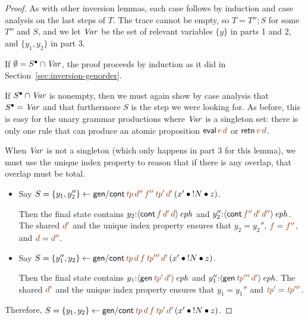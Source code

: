 \begin{proof}
  As with other inversion lemmas, each case follows by induction and
  case analysis on the last steps of $T$. The trace cannot be empty,
  so $T = T''; S$ for some $T''$ and $S$, and we let ${\it Var}$ be
  the set of relevant variables $\{y\}$ in parts 1 and 2, and
  $\{y_1,y_2\}$ in part 3.

  If $\emptyset = S^{\bullet} \cap {\it Var}$, the proof proceeds by
  induction as it did in Section~\ref{sec:inversion-genorder}.

  If $S^{\bullet} \cap {\it Var}$ is nonempty, then we must again show
  by case analysis that $S^{\bullet} = {\it Var}$ and that furthermore
  $S$ is the step we were looking for. As before, this is easy for the
  unary grammar productions where ${\it Var}$ is a singleton set:
  there is only one rule that can produce an atomic proposition 
  ${\sf eval}\,\lf{e}\,\lf{d}$ or ${\sf retn}\,\lf{v}\,\lf{d}$. 

  When ${\it Var}$ is not a singleton (which only happens in part 3
  for this lemma), we must use the unique index property to reason
  that if there is any overlap, that overlap must be total.
  \begin{itemize}
  \item Say $S = \trstep{y_1, y_2''}
    {{\sf gen/cont}\,
      \lf{{\it tp}}\,\lf{d''}\,\lf{f''}\,\lf{{\it tp}'}\,\lf{d'}\,
      (\tfuser{x'}{\tfuser{\tbangr{N}}{z}})}$.

      Then the final state contains
      $y_2{:}\iseph{\susp{{\sf cont}\,\lf{f}\,\lf{d'}\,\lf{d}}}$
      and
      $y_2''{:}\iseph{\susp{{\sf cont}\,\lf{f''}\,\lf{d'}\,\lf{d''}}}$.
      The shared $\lf{d'}$ and the unique index property 
      ensures that $y_2 = y_2''$, $\lf{f} = \lf{f''}$, and
      $\lf{d} = \lf{d''}$.

  \smallskip
  \item Say  $S = \trstep{y_1'', y_2}
    {{\sf gen/cont}\,
      \lf{{\it tp}}\,\lf{d}\,\lf{f}\,\lf{{\it tp}'''}\,\lf{d'}\,
      (\tfuser{x'}{\tfuser{\tbangr{N}}{z}})}$.

    Then the final state contains
    $y_1{:}\iseph{\susp{{\sf gen}\,\lf{{\it tp}'}\,\lf{d'}}}$
    and 
    $y_1''{:}\iseph{\susp{{\sf gen}\,\lf{{\it tp}'''}\,\lf{d'}}}$.
    The shared $\lf{d'}$ and the unique index property ensures that
    $y_1 = y_1''$ and $\lf{{\it tp}'} = \lf{{\it tp}'''}$. 
  \end{itemize}
Therefore, $S = \trstep{y_1, y_2}
    {{\sf gen/cont}\,
      \lf{{\it tp}}\,\lf{d}\,\lf{f}\,\lf{{\it tp}'}\,\lf{d'}\,
      (\tfuser{x'}{\tfuser{\tbangr{N}}{z}})}$.
\end{proof}

